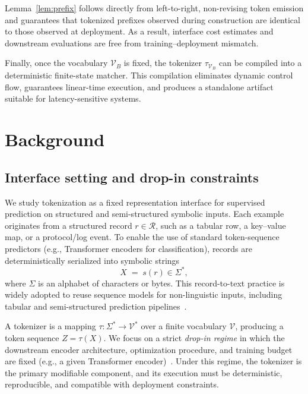 Lemma~\ref{lem:prefix} follows directly from left-to-right, non-revising token emission and guarantees that tokenized prefixes observed during construction are identical to those observed at deployment.
As a result, interface cost estimates and downstream evaluations are free from training--deployment mismatch.

Finally, once the vocabulary $\mathcal{V}_B$ is fixed, the tokenizer $\tau_{\mathcal{V}_B}$ can be compiled into a deterministic finite-state matcher.
This compilation eliminates dynamic control flow, guarantees linear-time execution, and produces a standalone artifact suitable for latency-sensitive systems.
\section{Background}
\label{sec:background}

\subsection{Interface setting and drop-in constraints}
\label{sec:bg_setting}

We study tokenization as a fixed representation interface for supervised prediction on structured and
semi-structured symbolic inputs.
Each example originates from a structured record $r \in \mathcal{R}$, such as a tabular row, a key--value map,
or a protocol/log event.
To enable the use of standard token-sequence predictors (e.g., Transformer encoders for classification), records are deterministically serialized into symbolic
strings
\begin{equation}
X \;=\; s(r) \in \Sigma^\ast,
\label{eq:bg_serialization}
\end{equation}
where $\Sigma$ is an alphabet of characters or bytes.
This record-to-text practice is widely adopted to reuse sequence models for non-linguistic inputs, including
tabular and semi-structured prediction pipelines~\cite{yin2020tabert,herzig2020tapas}.

A tokenizer is a mapping $\tau : \Sigma^\ast \rightarrow \mathcal{V}^\ast$ over a finite vocabulary
$\mathcal{V}$, producing a token sequence $Z = \tau(X)$.
We focus on a strict \emph{drop-in regime} in which the downstream encoder architecture, optimization procedure,
and training budget are fixed (e.g., a given Transformer encoder)~\cite{vaswani2017attention,devlin2019bert}.
Under this regime, the tokenizer is the primary modifiable component, and its execution must be deterministic,
reproducible, and compatible with deployment constraints.

